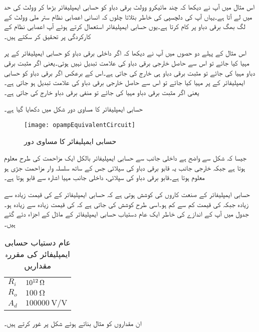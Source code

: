 
	اس مثال میں آپ نے دیکھا کہ چند مائیکرو وولٹ برقی دباو کو حسابی ایمپلیفائر بڑھا کر وولٹ کی حد میں لے آتا ہے۔یہاں آپ کی دلچسپی کی خاطر بتلاتا چلوں کہ انسانی اعصابی نظام  ستر ملی وولٹ  کے لگ بھگ برقی دباو پر کام کرتا ہے۔یوں حسابی ایمپلیفائر استعمال کرتے ہوئے  آپ اعصابی نظام کے کارکردگی پر تحقیق کر سکتے ہیں۔ 

	اس مثال کے پہلے دو حصوں میں آپ نے دیکھا کہ اگر داخلی برقی دباو کو حسابی ایمپلیفائر کے   پر مہیا کیا جائے تو اس سے حاصل خارجی برقی دباو کی علامت تبدیل نہیں ہوتی۔یعنی اگر مثبت برقی دباو مہیا کی جائے تو مثبت برقی دباو ہی خارج کی جاتی ہے۔اس کے برعکس اگر برقی دباو کو حسابی ایمپلیفائر کے   پر مہیا کیا جائے تو اس سے حاصل خارجی برقی دباو کی علامت تبدیل ہو جاتی ہے۔یعنی اگر مثبت برقی دباو مہیا کی جائے تو منفی برقی دباو خارج کی جاتی ہے۔

حسابی ایمپلیفائر کا مساوی دور شکل  میں دکھایا گیا ہے۔
\begin{figure}
\centering
\texttt{[image: opampEquivalentCircuit]}
\caption{حسابی ایمپلیفائر کا مساوی دور}
\label{شکل_حسابی_ایمپلیفائر_کا_مساوی_دور}
\end{figure}
جیسا کہ شکل سے واضح ہے داخلی جانب سے حسابی ایمپلیفائر بالکل ایک مزاحمت  کی طرح معلوم ہوتا ہے جبکہ خارجی جانب  یہ  قابو برقی دباو کی سپلائی  جس کے ساتھ سلسلہ وار مزاحمت  جڑی ہو معلوم ہوتا ہے۔قابو برقی دباو کی سپلائی، داخلی جانب مہیا اشارہ سے قابو ہوتا ہے۔

	حسابی ایمپلیفائر کے صنعت کاروں کی کوشش ہوتی ہے کہ حسابی ایمپلیفائر کے   کی قیمت زیادہ سے زیادہ جبکہ    کی قیمت کم سے کم ہو۔اسی طرح کوشش کی جاتی ہے کہ    کی قیمت زیادہ سے زیادہ ہو۔جدول  میں آپ کے اندازے کی خاطر ایک عام دستیاب حسابی ایمپلیفائر کے  ماڈل کے اجزاء دئے گئے ہیں۔
\begin{table}[ht]
\caption{عام دستیاب حسابی ایمپلیفائر کی مقررہ مقداریں}
\label{جدول_حسابی_ایمپلیفائر_عمومی_مقداریں}
\centering
\begin{tabular}{l l}
\toprule
$R_i$ &  $\SI{e{12}}{\ohm}$ \\
$R_o$ & $\SI{100}{\ohm}$\\
$A_d$  & $\SI[per=frac,fraction=nice]{100000}{\volt \per \volt}$ \\
\bottomrule
\end{tabular}
\end{table}
ان مقداروں کو مثال بناتے ہوئے شکل  پر غور کرتے ہیں۔

